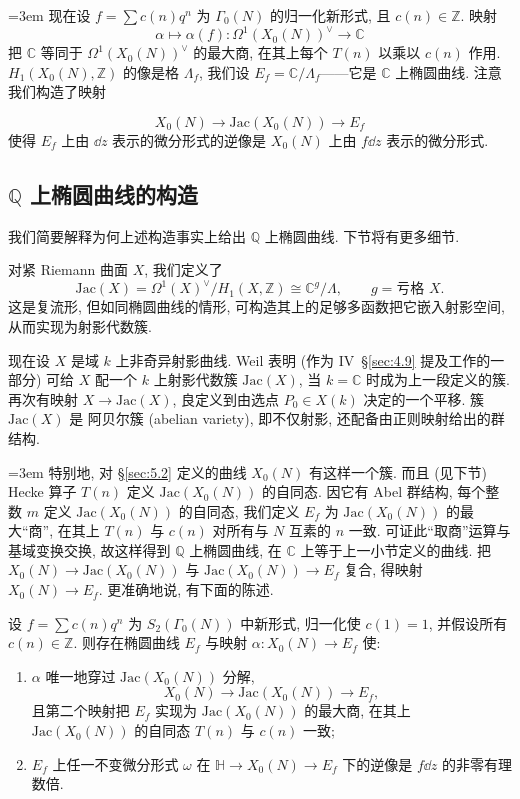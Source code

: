 {\emergencystretch=3em 现在设 $f = \sum c(n)q^n$ 为 $\Gamma_0(N)$ 的归一化新形式, 且 $c(n)\in\mathbb{Z}$. 映射
\[
\alpha\mapsto\alpha(f)\colon\Omega^1(X_0(N))^{\vee}\to\mathbb{C}
\]
把 $\mathbb{C}$ 等同于 $\Omega^1(X_0(N))^{\vee}$ 的最大商, 在其上每个 $T(n)$ 以乘以 $c(n)$ 作用. $H_1(X_0(N), \mathbb{Z})$ 的像是格 $\Lambda_f$, 我们设 $E_f = \mathbb{C}/\Lambda_f$——它是 $\mathbb{C}$ 上椭圆曲线. 注意我们构造了映射\par}
\[
X_0(N)\to\mathrm{Jac}(X_0(N))\to E_f
\]
使得 $E_f$ 上由 $\dd z$ 表示的微分形式的逆像是 $X_0(N)$ 上由 $f\dd z$ 表示的微分形式.

\subsection*{$\mathbb{Q}$ 上椭圆曲线的构造}

我们简要解释为何上述构造事实上给出 $\mathbb{Q}$ 上椭圆曲线. 下节将有更多细节.

对紧 Riemann 曲面 $X$, 我们定义了
\[
\mathrm{Jac}(X) = \Omega^1(X)^{\vee}/H_1(X, \mathbb{Z})\cong\mathbb{C}^g/\Lambda, \qquad g = \text{亏格 } X.
\]
这是复流形, 但如同椭圆曲线的情形, 可构造其上的足够多函数把它嵌入射影空间, 从而实现为射影代数簇.

现在设 $X$ 是域 $k$ 上非奇异射影曲线. Weil 表明 (作为 IV~\S\ref{sec:4.9} 提及工作的一部分) 可给 $X$ 配一个 $k$ 上射影代数簇 $\mathrm{Jac}(X)$, 当 $k = \mathbb{C}$ 时成为上一段定义的簇. 再次有映射 $X\to\mathrm{Jac}(X)$, 良定义到由选点 $P_0\in X(k)$ 决定的一个平移. 簇 $\mathrm{Jac}(X)$ 是 阿贝尔簇 (abelian variety), 即不仅射影, 还配备由正则映射给出的群结构.

{\emergencystretch=3em 特别地, 对 \S\ref{sec:5.2} 定义的曲线 $X_0(N)$ 有这样一个簇. 而且 (见下节) Hecke 算子 $T(n)$ 定义 $\mathrm{Jac}(X_0(N))$ 的自同态. 因它有 Abel 群结构, 每个整数 $m$ 定义 $\mathrm{Jac}(X_0(N))$ 的自同态, 我们定义 $E_f$ 为 $\mathrm{Jac}(X_0(N))$ 的最大``商'', 在其上 $T(n)$ 与 $c(n)$ 对所有与 $N$ 互素的 $n$ 一致. 可证此``取商''运算与基域变换交换, 故这样得到 $\mathbb{Q}$ 上椭圆曲线, 在 $\mathbb{C}$ 上等于上一小节定义的曲线. 把 $X_0(N)\to\mathrm{Jac}(X_0(N))$ 与 $\mathrm{Jac}(X_0(N))\to E_f$ 复合, 得映射 $X_0(N)\to E_f$. 更准确地说, 有下面的陈述.\par}

\begin{theorem} \label{thm:5.6.3} 
设 $f = \sum c(n)q^n$ 为 $S_2(\Gamma_0(N))$ 中新形式, 归一化使 $c(1) = 1$, 并假设所有 $c(n)\in\mathbb{Z}$. 则存在椭圆曲线 $E_f$ 与映射 $\alpha\colon X_0(N)\to E_f$ 使:
\begin{enumerate}[label=\textup{(\alph*)}]
\item $\alpha$ 唯一地穿过 $\mathrm{Jac}(X_0(N))$ 分解,
\[
X_0(N)\to\mathrm{Jac}(X_0(N))\to E_f,
\]
且第二个映射把 $E_f$ 实现为 $\mathrm{Jac}(X_0(N))$ 的最大商, 在其上 $\mathrm{Jac}(X_0(N))$ 的自同态 $T(n)$ 与 $c(n)$ 一致;
\item $E_f$ 上任一不变微分形式 $\omega$ 在 $\mathbb{H}\to X_0(N)\to E_f$ 下的逆像是 $f\dd z$ 的非零有理数倍.
\end{enumerate}
\end{theorem}

